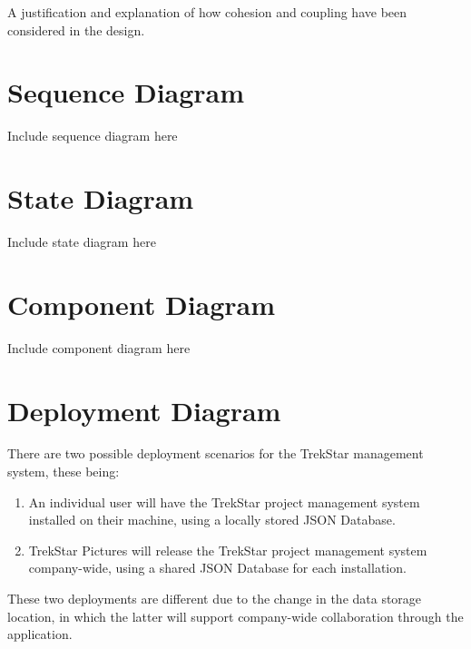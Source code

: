 \documentclass[
  english,
  a4paper,
,tablecaptionabove
]{scrartcl}
\providecommand{\tightlist}{%
  \setlength{\itemsep}{0pt}\setlength{\parskip}{0pt}}
\begin{document}
A justification and explanation of how cohesion and coupling have been
considered in the design.

\newpage

\hypertarget{sequence-diagram}{%
\section{Sequence Diagram}\label{sequence-diagram}}

Include sequence diagram here

\newpage

\hypertarget{state-diagram}{%
\section{State Diagram}\label{state-diagram}}

Include state diagram here

\newpage

\hypertarget{component-diagram}{%
\section{Component Diagram}\label{component-diagram}}

Include component diagram here

\newpage

\hypertarget{deployment-diagram}{%
\section{Deployment Diagram}\label{deployment-diagram}}

There are two possible deployment scenarios for the TrekStar management
system, these being:

\begin{enumerate}
\def\labelenumi{\arabic{enumi}.}
\tightlist
\item
  An individual user will have the TrekStar project management system
  installed on their machine, using a locally stored JSON Database.
\item
  TrekStar Pictures will release the TrekStar project management system
  company-wide, using a shared JSON Database for each installation.
\end{enumerate}

These two deployments are different due to the change in the data
storage location, in which the latter will support company-wide
collaboration through the application.
\end{document}
